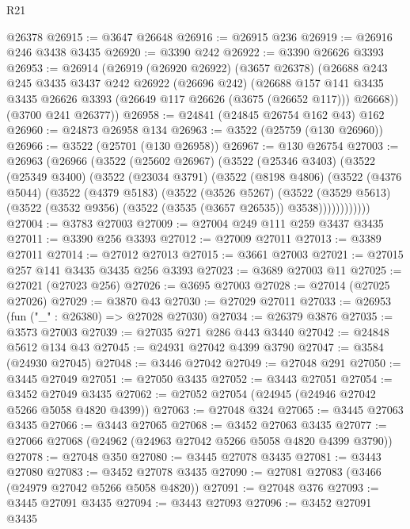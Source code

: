 \begin{lexlean}{R21}
\begin{coremodule}
    @26378
@26915 := @3647 @26648
@26916 := @26915 @236
@26919 := @26916 @246 @3438 @3435
@26920 := @3390 @242
@26922 := @3390 @26626 @3393
@26953 := @26914
    (@26919
      (@26920 @26922)
      (@3657 @26378)
      (@26688
        @243
        @245
        @3435
        @3437
        @242
        @26922
        (@26696 @242)
        (@26688
          @157
          @141
          @3435
          @3435
          @26626
          @3393
          (@26649 @117 @26626 (@3675 (@26652 @117)))
          @26668))
      (@3700 @241 @26377))
@26958 := @24841 (@24845 @26754 @162 @43) @162
@26960 := @24873 @26958 @134
@26963 := @3522 (@25759 (@130 @26960))
@26966 := @3522 (@25701 (@130 @26958))
@26967 := @130 @26754
@27003 := @26963
    (@26966
      (@3522
        (@25602 @26967)
        (@3522
          (@25346 @3403)
          (@3522
            (@25349 @3400)
            (@3522
              (@23034 @3791)
              (@3522
                (@8198 @4806)
                (@3522
                  (@4376 @5044)
                  (@3522
                    (@4379 @5183)
                    (@3522
                      (@3526 @5267)
                      (@3522
                        (@3529 @5613)
                        (@3522 (@3532 @9356) (@3522 (@3535 (@3657 @26535)) @3538))))))))))))
@27004 := @3783 @27003
@27009 := @27004 @249 @111 @259 @3437 @3435
@27011 := @3390 @256 @3393
@27012 := @27009 @27011
@27013 := @3389 @27011
@27014 := @27012 @27013
@27015 := @3661 @27003
@27021 := @27015 @257 @141 @3435 @3435 @256 @3393
@27023 := @3689 @27003 @11
@27025 := @27021 (@27023 @256)
@27026 := @3695 @27003
@27028 := @27014 (@27025 @27026)
@27029 := @3870 @43
@27030 := @27029 @27011
@27033 := @26953 (fun ("_" : @26380) => @27028 @27030)
@27034 := @26379 @3876
@27035 := @3573 @27003
@27039 := @27035 @271 @286 @443 @3440
@27042 := @24848 @5612 @134 @43
@27045 := @24931 @27042 @4399 @3790
@27047 := @3584 (@24930 @27045)
@27048 := @3446 @27042
@27049 := @27048 @291
@27050 := @3445 @27049
@27051 := @27050 @3435
@27052 := @3443 @27051
@27054 := @3452 @27049 @3435
@27062 := @27052 @27054 (@24945 (@24946 @27042 @5266 @5058 @4820 @4399))
@27063 := @27048 @324
@27065 := @3445 @27063 @3435
@27066 := @3443 @27065
@27068 := @3452 @27063 @3435
@27077 := @27066 @27068 (@24962 (@24963 @27042 @5266 @5058 @4820 @4399 @3790))
@27078 := @27048 @350
@27080 := @3445 @27078 @3435
@27081 := @3443 @27080
@27083 := @3452 @27078 @3435
@27090 := @27081 @27083 (@3466 (@24979 @27042 @5266 @5058 @4820))
@27091 := @27048 @376
@27093 := @3445 @27091 @3435
@27094 := @3443 @27093
@27096 := @3452 @27091 @3435

\end{coremodule}
\end{lexlean}

